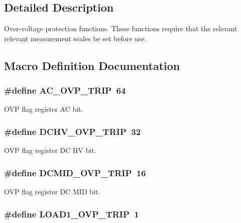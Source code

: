 \subsection{Detailed Description}
Over-\/voltage protection functions. These functions require that the relevant relevant measurement scales be set before use. 

\subsection{Macro Definition Documentation}
\hypertarget{a00036_abf1557b371e135706243aebb018260cc}{
\subsubsection[{A\-C\-\_\-\-O\-V\-P\-\_\-\-T\-R\-I\-P}]{\setlength{\rightskip}{0pt plus 5cm}\#define A\-C\-\_\-\-O\-V\-P\-\_\-\-T\-R\-I\-P~64}}\label{a00036_abf1557b371e135706243aebb018260cc}
O\-V\-P flag register A\-C bit. \hypertarget{a00036_a87d04fee238f7921a66521910b42244e}{
\subsubsection[{D\-C\-H\-V\-\_\-\-O\-V\-P\-\_\-\-T\-R\-I\-P}]{\setlength{\rightskip}{0pt plus 5cm}\#define D\-C\-H\-V\-\_\-\-O\-V\-P\-\_\-\-T\-R\-I\-P~32}}\label{a00036_a87d04fee238f7921a66521910b42244e}
O\-V\-P flag register D\-C H\-V bit. \hypertarget{a00036_a454809e1e9a6314875f8f833bd924bfb}{
\subsubsection[{D\-C\-M\-I\-D\-\_\-\-O\-V\-P\-\_\-\-T\-R\-I\-P}]{\setlength{\rightskip}{0pt plus 5cm}\#define D\-C\-M\-I\-D\-\_\-\-O\-V\-P\-\_\-\-T\-R\-I\-P~16}}\label{a00036_a454809e1e9a6314875f8f833bd924bfb}
O\-V\-P flag register D\-C M\-I\-D bit. \hypertarget{a00036_a818e48bd3796e85aff1e441d395d420e}{
\subsubsection[{L\-O\-A\-D1\-\_\-\-O\-V\-P\-\_\-\-T\-R\-I\-P}]{\setlength{\rightskip}{0pt plus 5cm}\#define L\-O\-A\-D1\-\_\-\-O\-V\-P\-\_\-\-T\-R\-I\-P~1}}\label{a00036_a818e48bd3796e85aff1e441d395d420e}
